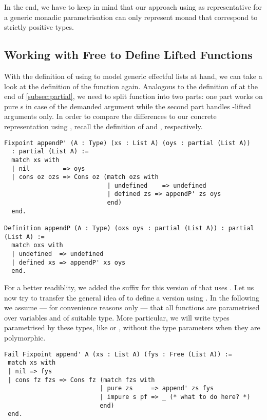 In the end, we have to keep in mind that our approach using
 as representative for a generic monadic parametrisation
can only represent monad that correspond to strictly positive types.

\subsection{Working with Free to Define Lifted Functions}

With the definition of  using  to model generic
effectful lists at hand, we can take a look at the definition of the
function  again.
Analogous to the definition of  at the end of
\autoref{subsec:partial}, we need to split function into two parts:
one part works on pure s in case of the demanded argument
while the second part handles -lifted arguments only.
In order to compare the differences to our concrete representation
using , recall the definition of  and
, respectively.

\begin{verbatim}
Fixpoint appendP' (A : Type) (xs : List A) (oys : partial (List A))
  : partial (List A) :=
  match xs with
  | nil         => oys
  | cons oz ozs => Cons oz (match ozs with
                            | undefined    => undefined
                            | defined zs => appendP' zs oys
                            end)
  end.

Definition appendP (A : Type) (oxs oys : partial (List A)) : partial (List A) :=
  match oxs with
  | undefined  => undefined
  | defined xs => appendP' xs oys
  end.
\end{verbatim}

For a better readiblity, we added the suffix  for this version
of  that uses .
Let us now try to transfer the general idea of  to
define a version using .
In the following we assume --- for convenience reasons only --- that
all functions are parametrised over variables  and
 of suitable type.
More particular, we will write types parametrised by these types, like
 or , without the type parameters when they are
polymorphic.

\begin{verbatim}
Fail Fixpoint append' A (xs : List A) (fys : Free (List A)) :=
 match xs with
 | nil => fys
 | cons fz fzs => Cons fz (match fzs with
                          | pure zs     => append' zs fys
                          | impure s pf => _ (* what to do here? *)
                          end)
 end.
\end{verbatim}

